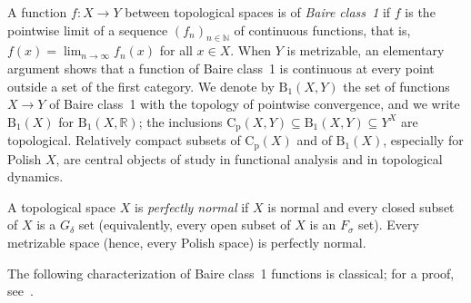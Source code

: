 \documentclass[psamsfonts]{amsart}
\theoremstyle{definition}
\theoremstyle{remark}
\newcommand{\Cp}{\mathrm{C}_{\mathrm{p}}}
\numberwithin{equation}{section}
\begin{document}
A function $f\colon X\to Y$ between topological spaces is of \emph{Baire class~1} if $f$ is the pointwise limit of a sequence $(f_n)_{n\in\mathbb{N}}$ of continuous functions, that is, $f(x)=\lim_{n\to\infty}f_n(x)$ for all $x\in X$.
When $Y$ is metrizable, an elementary argument shows that a function of Baire class~1 is continuous at every point outside a set of the first category.
We denote by $\mathrm{B}_1(X,Y)$ the set of functions $X\to Y$ of Baire class~1 with the topology of pointwise convergence, and we write $\mathrm{B}_1(X)$ for $\mathrm{B}_1(X,\mathbb{R})$;
the inclusions $\Cp(X,Y)\subseteq \mathrm{B}_1(X,Y)\subseteq Y^X$ are topological.
Relatively compact subsets of $\Cp(X)$ and of $\mathrm{B}_1(X)$, especially for Polish $X$, are central objects of study in functional analysis and in topological dynamics.

A topological space $X$ is \emph{perfectly normal} if $X$ is normal and every closed subset of $X$ is a $G_\delta$ set (equivalently, every open subset of $X$ is an $F_\sigma$ set).
Every metrizable space (hence, every Polish space) is perfectly normal.

The following characterization of Baire class~1 functions is classical; for a proof, see~\cite[Section 10]{Todorcevic_1997_TopicsTop}.
\end{document}
